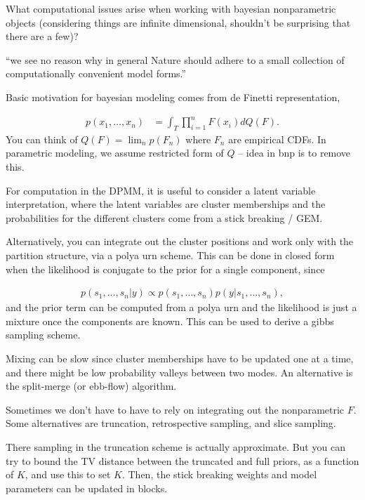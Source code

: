 \documentclass{article}
\begin{document}
What computational issues arise when working with bayesian nonparametric
objects (considering things are infinite dimensional, shouldn't be surprising
that there are a few)?

``we see no reason why in general Nature should adhere to a small collection of
computationally convenient model forms.''

Basic motivation for bayesian modeling comes from de Finetti representation,

\begin{align}
p\left(x_{1}, \dots, x_{n}\right) &= \int_{T} \prod_{i = 1}^{n} F\left(x_{i}\right) dQ\left(F\right).
\end{align}
You can think of $Q\left(F\right) = \lim_{n} p\left(F_{n}\right)$ where $F_{n}$
are empirical CDFs. In parametric modeling, we assume restricted form of $Q$ --
idea in bnp is to remove this.

For computation in the DPMM, it is useful to consider a latent variable
interpretation, where the latent variables are cluster memberships and the
probabilities for the different clusters come from a stick breaking / GEM.


Alternatively, you can integrate out the cluster positions and work only with
the partition structure, via a polya urn scheme. This can be done in closed form
when the likelihood is conjugate to the prior for a single component, since

\begin{align}
p\left(s_{1}, \dots, s_{n}\vert y\right) \propto p\left(s_{1}, \dots, s_{n}\right) p\left(y \vert s_{1}, \dots, s_{n}\right),
\end{align}
and the prior term can be computed from a polya urn and the likelihood is just a
mixture once the components are known. This can be used to derive a gibbs
sampling scheme.

Mixing can be slow since cluster memberships have to be updated one at a time,
and there might be low probability valleys between two modes. An alternative is
the split-merge (or ebb-flow) algorithm.

Sometimes we don't have to have to rely on integrating out the nonparametric
$F$. Some alternatives are truncation, retrospective sampling, and slice
sampling.

There sampling in the truncation scheme is actually approximate. But you can try
to bound the TV distance between the truncated and full priors, as a function of
$K$, and use this to set $K$. Then, the stick breaking weights and model
parameters can be updated in blocks.
\end{document}
